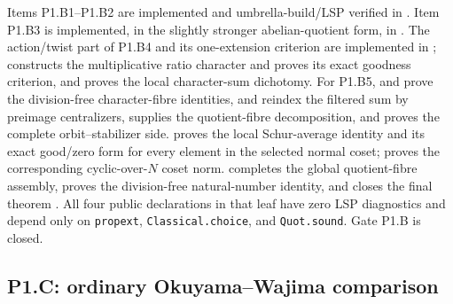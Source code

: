 \documentclass[11pt]{article}
\begin{document}
Items P1.B1--P1.B2 are implemented and umbrella-build/LSP verified in
.  Item P1.B3 is implemented, in the
slightly stronger abelian-quotient form, in
.  The action/twist part of P1.B4 and its
one-extension criterion are implemented in ;
 constructs the multiplicative ratio
character and proves its exact goodness criterion, and
 proves the local character-sum dichotomy.
For P1.B5,  and
 prove the division-free
character-fibre identities,  and
 reindex the filtered sum by
preimage centralizers,  supplies
the quotient-fibre decomposition, and 
proves the complete orbit--stabilizer side.
 proves the local Schur-average
identity and its exact good/zero form for every element in the selected
normal coset;  proves the corresponding
cyclic-over-\(N\) coset norm.
 completes the global quotient-fibre
assembly, proves the division-free natural-number identity, and closes
the final theorem
.
All four public declarations in that leaf have zero LSP diagnostics and
depend only on \texttt{propext}, \texttt{Classical.choice}, and
\texttt{Quot.sound}.  Gate P1.B is closed.

\subsection{P1.C: ordinary Okuyama--Wajima comparison}
\end{document}
